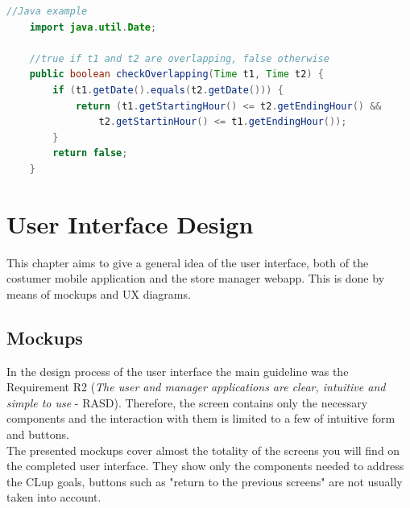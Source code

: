 \documentclass[]{article}
\begin{document}
	 \begin{lstlisting}[language=java]
	//Java example
	import java.util.Date;
	
	//true if t1 and t2 are overlapping, false otherwise	
	public boolean checkOverlapping(Time t1, Time t2) {
		if (t1.getDate().equals(t2.getDate())) {
			return (t1.getStartingHour() <= t2.getEndingHour() &&
				t2.getStartinHour() <= t1.getEndingHour());
		} 
		return false;
	}
	\end{lstlisting}

	\section{User Interface Design}
	This chapter aims to give a general idea of the user interface, both of the costumer mobile application and the store manager webapp. 
	This is done by means of mockups and UX diagrams.
		
		\subsection{Mockups}
		In the design process of the user interface the main guideline was the Requirement R2 (\textit{The user and manager applications are clear, intuitive and simple to use} - RASD). Therefore, the screen contains only the necessary components and the interaction with them is limited to a few of intuitive form and buttons.
		\\The presented mockups cover almost the totality of the screens you will find on the completed user interface. They show only the components needed to address the CLup goals, buttons such as "return to the previous screens" are not usually taken into account.
		
\end{document}
